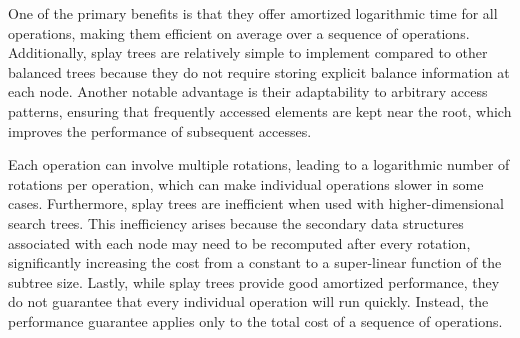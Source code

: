 One of the primary benefits is that they offer amortized logarithmic time for all operations, making them efficient on average over a sequence of operations. 
Additionally, splay trees are relatively simple to implement compared to other balanced trees because they do not require storing explicit balance information at each node. 
Another notable advantage is their adaptability to arbitrary access patterns, ensuring that frequently accessed elements are kept near the root, which improves the performance of subsequent accesses.

Each operation can involve multiple rotations, leading to a logarithmic number of rotations per operation, which can make individual operations slower in some cases. 
Furthermore, splay trees are inefficient when used with higher-dimensional search trees. 
This inefficiency arises because the secondary data structures associated with each node may need to be recomputed after every rotation, significantly increasing the cost from a constant to a super-linear function of the subtree size.
Lastly, while splay trees provide good amortized performance, they do not guarantee that every individual operation will run quickly. 
Instead, the performance guarantee applies only to the total cost of a sequence of operations.